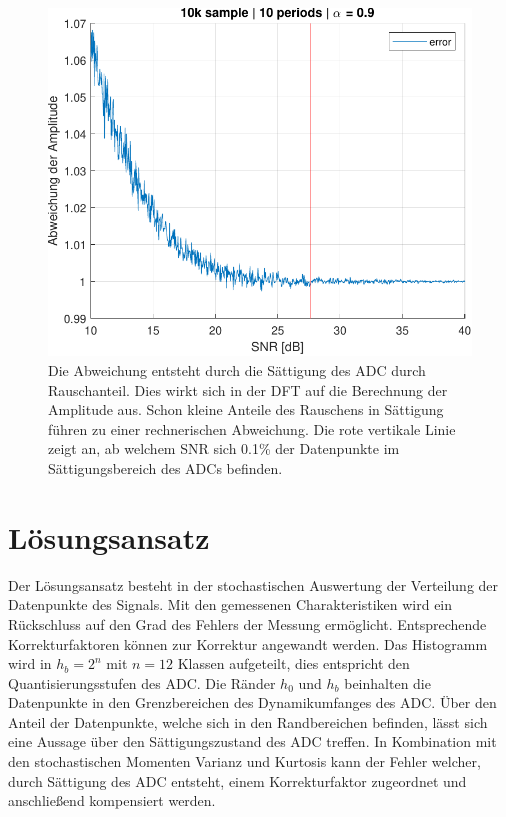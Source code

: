  \begin{figure}[h!] 
	\centering 
	\includegraphics[width=.8\columnwidth]{../img/noise-err.pdf}
	\caption{Die Abweichung entsteht durch die Sättigung des ADC durch Rauschanteil. Dies wirkt sich in der DFT auf die Berechnung der Amplitude aus. Schon kleine Anteile des Rauschens in Sättigung führen zu einer rechnerischen Abweichung. Die rote vertikale Linie zeigt an, ab welchem SNR sich 0.1\% der Datenpunkte im Sättigungsbereich des ADCs befinden.}
	\label{fig:Rauschanteil}
\end{figure}

\section{Lösungsansatz} 

Der Lösungsansatz besteht in der stochastischen Auswertung der Verteilung der Datenpunkte des Signals. Mit den gemessenen Charakteristiken wird ein Rückschluss auf den Grad des Fehlers der Messung ermöglicht. Entsprechende Korrekturfaktoren können zur Korrektur angewandt werden. Das Histogramm wird in $h_b = 2^n$ mit $n = 12$ Klassen aufgeteilt, dies entspricht den Quantisierungsstufen des ADC. Die Ränder $h_0$ und $h_b$ beinhalten die Datenpunkte in den Grenzbereichen des Dynamikumfanges des ADC. Über den Anteil der Datenpunkte, welche sich in den Randbereichen befinden, lässt sich eine Aussage über den Sättigungszustand des ADC treffen. In Kombination mit den stochastischen Momenten Varianz und Kurtosis kann der Fehler welcher, durch Sättigung des ADC entsteht, einem Korrekturfaktor zugeordnet und anschließend kompensiert werden. 


